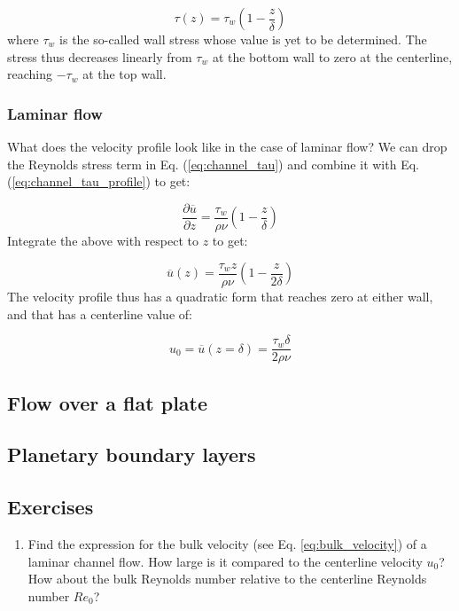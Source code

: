 \documentclass[12pt]{article}
\numberwithin{equation}{section}
\numberwithin{figure}{section}
\numberwithin{table}{section}
\begin{document}
\begin{equation}
  \tau(z) = \tau_w \left( 1 - \frac{z}{\delta} \right)
  \label{eq:channel_tau_profile}
\end{equation}
where $\tau_w$ is the so-called wall stress whose value is yet to be determined.
The stress thus decreases linearly from $\tau_w$ at the bottom wall to zero at
the centerline, reaching $-\tau_w$ at the top wall.

\subsubsection{Laminar flow}

What does the velocity profile look like in the case of laminar flow?
We can drop the Reynolds stress term in Eq. (\ref{eq:channel_tau}) and combine
it with Eq. (\ref{eq:channel_tau_profile}) to get:

\begin{equation}
  \frac{\partial \overline{u}}{\partial z} = \frac{\tau_w}{\rho \nu} \left(1 - \frac{z}{\delta}\right)
\end{equation}
Integrate the above with respect to $z$ to get:

\begin{equation}
  \overline{u}(z) = \frac{\tau_w z}{\rho \nu} \left(1 - \frac{z}{2\delta} \right)
\end{equation}
The velocity profile thus has a quadratic form that reaches zero at either wall,
and that has a centerline value of:

\begin{equation}
  u_0 = \overline{u}(z=\delta) = \frac{\tau_w \delta}{2 \rho \nu}
\end{equation}

\subsection{Flow over a flat plate}

\subsection{Planetary boundary layers}

\subsection{Exercises}

\begin{enumerate}
  \item Find the expression for the bulk velocity (see Eq. \ref{eq:bulk_velocity})
  of a laminar channel flow. How large is it compared to the centerline velocity
  $u_0$? How about the bulk Reynolds number relative to the centerline Reynolds
  number $Re_0$?
\end{enumerate}
\end{document}
